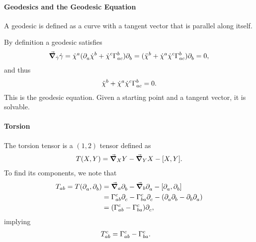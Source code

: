 \paragraph{Geodesics and the Geodesic Equation}
A geodesic is defined as a curve with a tangent vector that is parallel along itself.

By definition a geodesic satisfies
\begin{align*}
	\dcov{\dot{\gamma}}{\dot{\gamma}} = \dot{\chi}^{a}(\del{}{a}{\dot{\chi}^{b}} + \dot{\chi}^{c}\chris{b}{a}{c})\del{}{b}{} = (\ddot{\chi}^{b} + \dot{\chi}^{a}\dot{\chi}^{c}\chris{b}{a}{c})\del{}{b}{} = 0,
\end{align*}
and thus
\begin{align*}
	\ddot{\chi}^{b} + \dot{\chi}^{a}\dot{\chi}^{c}\chris{b}{a}{c} = 0.
\end{align*}
This is the geodesic equation. Given a starting point and a tangent vector, it is solvable.

\paragraph{Torsion}
The torsion tensor is a $(1, 2)$ tensor defined as
\begin{align*}
	T(X, Y) = \dcov{X}{Y} - \dcov{Y}{X} - \comm{X}{Y}.
\end{align*}
To find its components, we note that
\begin{align*}
	T_{ab} = T(\del{}{a}{}, \del{}{b}{}) &= \dcov{a}{\del{}{b}{}} - \dcov{b}{\del{}{a}{}} - \comm{\del{}{a}{}}{\del{}{b}{}} \\
	                                 &= \chris{c}{a}{b}\del{}{c}{} - \chris{c}{b}{a}\del{}{c}{} - (\del{}{a}{\del{}{b}{}} - \del{}{b}{\del{}{a}{}}) \\
	                                 &= (\chris{c}{a}{b} - \chris{c}{b}{a})\del{}{c}{},
\end{align*}
implying
\begin{align*}
	T_{ab}^{c} &= \chris{c}{a}{b} - \chris{c}{b}{a}.
\end{align*}

